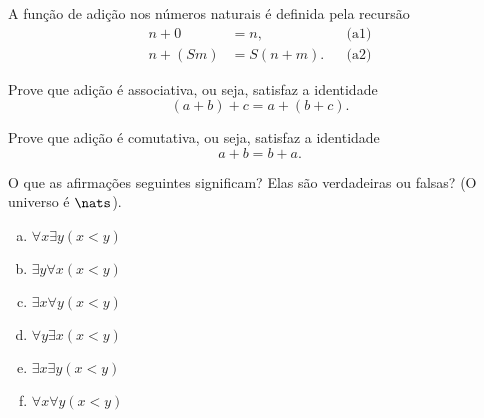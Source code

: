 \begin{definition}[Adição]
	A função de adição nos números naturais é definida pela recursão
	$$
		\begin{aligned}
			n + 0 &= n, && \text{(a1)}\\
			n + (Sm) &= S(n + m). && \text{(a2)}
		\end{aligned}
	$$
\end{definition}

\begin{exercise}
	Prove que adição é associativa, ou seja, satisfaz a identidade
	$$
		(a + b) + c = a + (b + c).
	$$
\end{exercise}

\begin{exercise}
	Prove que adição é comutativa, ou seja, satisfaz a identidade
	$$
		a + b = b + a.
	$$
\end{exercise}

\begin{exercise}
    O que as afirmações seguintes significam? Elas são verdadeiras ou falsas? (O universo é $\nats$).
    \begin{enumerate}[(a)]
        \item $\forall x \exists y (x < y)$
        \item $\exists y \forall x (x < y)$
        \item $\exists x \forall y (x < y)$
        \item $\forall y \exists x (x < y)$
        \item $\exists x \exists y (x < y)$
        \item $\forall x \forall y (x < y)$
    \end{enumerate}
\end{exercise}
